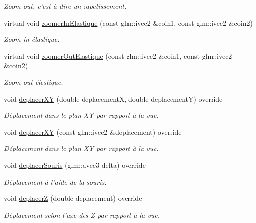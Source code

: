 \begin{DoxyCompactItemize}
\begin{DoxyCompactList}\small\item\em Zoom out, c'est-\/à-\/dire un rapetissement. \end{DoxyCompactList}\item 
virtual void \hyperlink{classvue_1_1_vue_ortho_aa8fb0de647e8c534986348f2bd5fe4a6}{zoomer\-In\-Elastique} (const glm\-::ivec2 \&coin1, const glm\-::ivec2 \&coin2)
\begin{DoxyCompactList}\small\item\em Zoom in élastique. \end{DoxyCompactList}\item 
virtual void \hyperlink{classvue_1_1_vue_ortho_afac237d33e78faa0a8c8aa7d146f2042}{zoomer\-Out\-Elastique} (const glm\-::ivec2 \&coin1, const glm\-::ivec2 \&coin2)
\begin{DoxyCompactList}\small\item\em Zoom out élastique. \end{DoxyCompactList}\item 
void \hyperlink{classvue_1_1_vue_ortho_a047d5ce08de6ebb77535a03e2de76d51}{deplacer\-X\-Y} (double deplacement\-X, double deplacement\-Y) override
\begin{DoxyCompactList}\small\item\em Déplacement dans le plan X\-Y par rapport à la vue. \end{DoxyCompactList}\item 
void \hyperlink{classvue_1_1_vue_ortho_a9e97395a88e97546cdeadcfc8460a95f}{deplacer\-X\-Y} (const glm\-::ivec2 \&deplacement) override
\begin{DoxyCompactList}\small\item\em Déplacement dans le plan X\-Y par rapport à la vue. \end{DoxyCompactList}\item 
void \hyperlink{classvue_1_1_vue_ortho_af77b66824c232a3bd775de17e78d8605}{deplacer\-Souris} (glm\-::dvec3 delta) override
\begin{DoxyCompactList}\small\item\em Déplacement à l'aide de la souris. \end{DoxyCompactList}\item 
void \hyperlink{classvue_1_1_vue_ortho_a374e7c90b30bac0ac18abca99e01ead1}{deplacer\-Z} (double deplacement) override
\begin{DoxyCompactList}\small\item\em Déplacement selon l'axe des Z par rapport à la vue. \end{DoxyCompactList}\item 

\end{DoxyCompactItemize}
